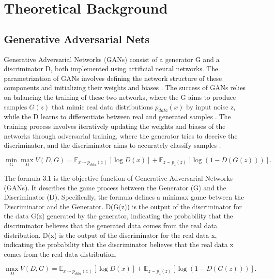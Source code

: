 \chapter{Theoretical Background}
\label{Theoretical Background}

\section*{Generative Adversarial Nets}

Generative Adversarial Networks (GANs) consist of a generator G and a discriminator D, 
both implemented using artificial neural networks. The parametrization of GANs involves 
defining the network structure of these components and initializing their weights and biases \citep{10.1007/s10928-021-09787-4}. 
The success of GANs relies on balancing the training of these two networks, where the 
G aims to produce samples $G(z)$ that mimic real data distributions $p_{data}(x)$ by input noise z, while the D 
learns to differentiate between real and generated samples \citep{10.1109/taslp.2017.2761547}. 
The training process involves iteratively updating the weights and biases of the networks through 
adversarial training, where the generator tries to deceive the discriminator, and the discriminator 
aims to accurately classify samples \citep{10.48550/arxiv.1802.05637}.

\begin{equation}
    \min_{G} \max_{D} V(D, G) = \mathbb{E}_{x \sim p_{data}(x)} [\log D(x)] + \mathbb{E}_{z \sim p_{z}(z)} [\log(1 - D(G(z)))].
\end{equation}


The formula 3.1 is the objective function of Generative Adversarial Networks (GANs). 
It describes the game process between the Generator (G) and the Discriminator (D). Specifically, the formula defines a minimax game between the Discriminator and the Generator.
D(G(z)) is the output of the discriminator for the data G(z) generated by the generator, 
indicating the probability that the discriminator believes that the generated data comes from the real data distribution.
D(x) is the output of the discriminator for the real data x, 
indicating the probability that the discriminator believes that the real data x comes from the real data distribution.


\begin{equation}
    \max_{D} V(D, G) = \mathbb{E}_{x \sim p_{data}(x)} [\log D(x)] + \mathbb{E}_{z \sim p_{z}(z)} [\log(1 - D(G(z)))].
\end{equation}

